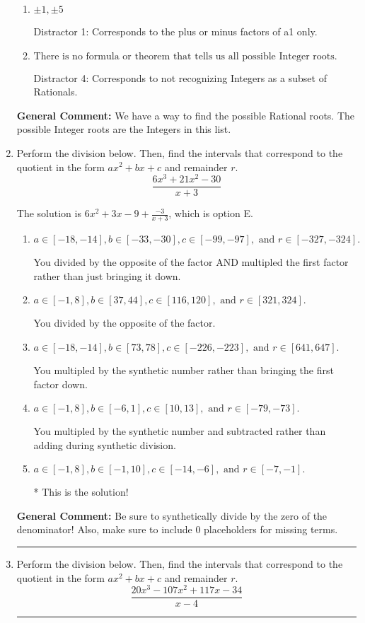 \documentclass{extbook}[14pt]
\newcommand{\litem}[1]{\item #1

\rule{\textwidth}{0.4pt}}
\begin{document}
\begin{enumerate}
{\begin{enumerate}[label=\Alph*.]
 Distractor 3: Corresponds to the plus or minus of the inverse quotient (an/a0) of the factors. 
\item \( \pm 1,\pm 5 \)

 Distractor 1: Corresponds to the plus or minus factors of a1 only.
\item \( \text{There is no formula or theorem that tells us all possible Integer roots.} \)

 Distractor 4: Corresponds to not recognizing Integers as a subset of Rationals.
\end{enumerate}

\textbf{General Comment:} We have a way to find the possible Rational roots. The possible Integer roots are the Integers in this list.
}
\litem{
Perform the division below. Then, find the intervals that correspond to the quotient in the form $ax^2+bx+c$ and remainder $r$.
\[ \frac{6x^{3} +21 x^{2} -30}{x + 3} \]

The solution is \( 6x^{2} +3 x -9 + \frac{-3}{x + 3} \), which is option E.\begin{enumerate}[label=\Alph*.]
\item \( a \in [-18, -14], b \in [-33, -30], c \in [-99, -97], \text{ and } r \in [-327, -324]. \)

 You divided by the opposite of the factor AND multipled the first factor rather than just bringing it down.
\item \( a \in [-1, 8], b \in [37, 44], c \in [116, 120], \text{ and } r \in [321, 324]. \)

 You divided by the opposite of the factor.
\item \( a \in [-18, -14], b \in [73, 78], c \in [-226, -223], \text{ and } r \in [641, 647]. \)

 You multipled by the synthetic number rather than bringing the first factor down.
\item \( a \in [-1, 8], b \in [-6, 1], c \in [10, 13], \text{ and } r \in [-79, -73]. \)

 You multipled by the synthetic number and subtracted rather than adding during synthetic division.
\item \( a \in [-1, 8], b \in [-1, 10], c \in [-14, -6], \text{ and } r \in [-7, -1]. \)

* This is the solution!
\end{enumerate}

\textbf{General Comment:} Be sure to synthetically divide by the zero of the denominator! Also, make sure to include 0 placeholders for missing terms.
}
\litem{
Perform the division below. Then, find the intervals that correspond to the quotient in the form $ax^2+bx+c$ and remainder $r$.
\[ \frac{20x^{3} -107 x^{2} +117 x -34}{x -4} \]

}
\end{enumerate}
\end{document}
